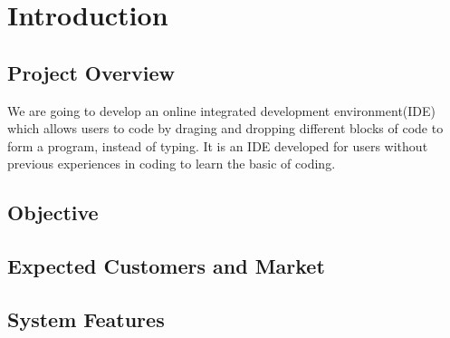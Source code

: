 \documentclass[CSCI3100_Documentation]{subfiles}
\begin{document}
  \section{Introduction}
  \subsection{Project Overview}
  We are going to develop an online integrated development environment(IDE) which allows users to code by draging and dropping different blocks of code to form a program, instead of typing. It is an IDE developed for users without previous experiences in coding to learn the basic of coding.
  \subsection{Objective}
  \subsection{Expected Customers and Market}
  \subsection{System Features}
\end{document}
